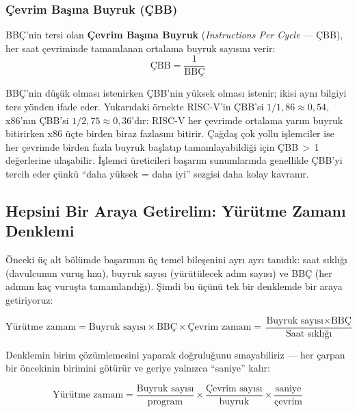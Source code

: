 \subsubsection*{Çevrim Başına Buyruk (ÇBB)}

BBÇ'nin tersi olan \textbf{Çevrim Başına Buyruk} (\emph{Instructions Per Cycle} --- ÇBB), her saat çevriminde tamamlanan ortalama buyruk sayısını verir:
\begin{equation}
\text{ÇBB} = \frac{1}{\text{BBÇ}}
\label{eq:cbb}
\end{equation}

\noindent BBÇ'nin düşük olması istenirken ÇBB'nin yüksek olması istenir; ikisi aynı bilgiyi ters yönden ifade eder. Yukarıdaki örnekte RISC-V'in ÇBB'si $1/1{,}86 \approx 0{,}54$, x86'nın ÇBB'si $1/2{,}75 \approx 0{,}36$'dır: RISC-V her çevrimde ortalama yarım buyruk bitirirken x86 üçte birden biraz fazlasını bitirir. Çağdaş çok yollu işlemciler ise her çevrimde birden fazla buyruk başlatıp tamamlayabildiği için ÇBB\,$>$\,1 değerlerine ulaşabilir. İşlemci üreticileri başarım sunumlarında genellikle ÇBB'yi tercih eder çünkü ``daha yüksek = daha iyi'' sezgisi daha kolay kavranır.

\subsection{Hepsini Bir Araya Getirelim: Yürütme Zamanı Denklemi}
\label{subsec:yurutme-zamani-denklemi}

Önceki üç alt bölümde başarımın üç temel bileşenini ayrı ayrı tanıdık: saat sıklığı (davulcunun vuruş hızı), buyruk sayısı (yürütülecek adım sayısı) ve BBÇ (her adımın kaç vuruşta tamamlandığı). Şimdi bu üçünü tek bir denklemde bir araya getiriyoruz:

\begin{equation}
\text{Yürütme zamanı} = \text{Buyruk sayısı} \times \text{BBÇ} \times \text{Çevrim zamanı} = \frac{\text{Buyruk sayısı} \times \text{BBÇ}}{\text{Saat sıklığı}}
\label{eq:yurutme-zamani-bbc}
\end{equation}

Denklemin birim çözümlemesini yaparak doğruluğunu sınayabiliriz --- her çarpan bir öncekinin birimini götürür ve geriye yalnızca ``saniye'' kalır:

\begin{equation}
\text{Yürütme zamanı} = \frac{\text{Buyruk sayısı}}{\text{program}} \times \frac{\text{Çevrim sayısı}}{\text{buyruk}} \times \frac{\text{saniye}}{\text{çevrim}}
\label{eq:yurutme-birim}
\end{equation}

